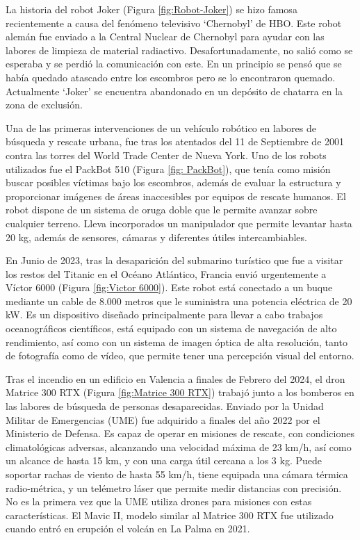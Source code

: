 La historia del robot Joker (Figura \ref{fig:Robot-Joker}) se hizo famosa recientemente a causa del fenómeno televisivo `Chernobyl' de HBO. Este robot alemán fue enviado a la Central Nuclear de Chernobyl para ayudar con las labores de limpieza de material radiactivo. Desafortunadamente, no salió como se esperaba y se perdió la comunicación con este. En un principio se pensó que se había quedado atascado entre los escombros pero se lo encontraron quemado. Actualmente `Joker' se encuentra abandonado en un depósito de chatarra en la zona de exclusión.

Una de las primeras intervenciones de un vehículo robótico en labores de búsqueda y rescate urbana, fue tras los atentados del 11 de Septiembre de 2001 contra las torres del World Trade Center de Nueva York. Uno de los robots utilizados fue el PackBot 510 (Figura \ref{fig: PackBot}), que tenía como misión buscar posibles víctimas bajo los escombros, además de evaluar la estructura y proporcionar imágenes de áreas inaccesibles por equipos de rescate humanos. El robot dispone de un sistema de oruga doble que le permite avanzar sobre cualquier terreno. Lleva incorporados un manipulador que permite levantar hasta 20 kg, además de sensores, cámaras y diferentes útiles intercambiables.

En Junio de 2023, tras la desaparición del submarino turístico que fue a visitar los restos del Titanic en el Océano Atlántico, Francia envió urgentemente a Víctor 6000 (Figura \ref{fig:Victor 6000}). Este robot está conectado a un buque mediante un cable de 8.000 metros que le suministra una potencia eléctrica de 20 kW. Es un dispositivo diseñado principalmente para llevar a cabo trabajos oceanográficos científicos, está equipado con un sistema de navegación de alto rendimiento, así como con un sistema de imagen óptica de alta resolución, tanto de fotografía como de vídeo, que permite tener una percepción visual del entorno.

Tras el incendio en un edificio en Valencia a finales de Febrero del 2024, el dron Matrice 300 RTX (Figura \ref{fig:Matrice 300 RTX}) trabajó junto a los bomberos en las labores de búsqueda de personas desaparecidas. Enviado por la Unidad Militar de Emergencias (UME) fue adquirido a finales del año 2022 por el Ministerio de Defensa. Es capaz de operar en misiones de rescate, con condiciones climatológicas adversas, alcanzando una velocidad máxima de 23 km/h, así como un alcance de hasta 15 km, y con una carga útil cercana a los 3 kg. Puede soportar rachas de viento de hasta 55 km/h, tiene equipada una cámara térmica radio-métrica, y un telémetro láser que permite medir distancias con precisión. No es la primera vez que la UME utiliza drones para misiones con estas características. El Mavic II, modelo similar al Matrice 300 RTX fue utilizado cuando entró en erupción el volcán en La Palma en 2021.


